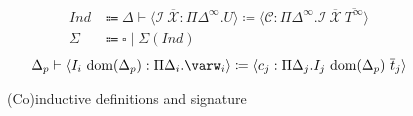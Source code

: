 \begin{figure}
\centering
\begin{align*}
\textit{Ind} &\Coloneqq \Delta \vdash \langle \mathcal{I}\ \overline{\mathcal{X}}: \Pi\Delta^\infty. U \rangle \coloneqq \langle \mathcal{C}: \Pi\Delta^\infty. \mathcal{I}\ \overline{\mathcal{X}}\ \overline{T^\infty} \rangle \\
\Sigma &\Coloneqq \square \mid \Sigma (\textit{Ind})
\end{align*}
\begin{equation*}
\Delta_p \vdash \langle I_i\ \dom{\Delta_p}: \Pi\Delta_i. \varw_i \rangle \coloneqq \langle c_j: \Pi\Delta_j. I_j\ \dom{\Delta_p}\ \overline{t}_j \rangle
\end{equation*}
\caption{(Co)inductive definitions and signature}
\label{fig:inductives}
\end{figure}